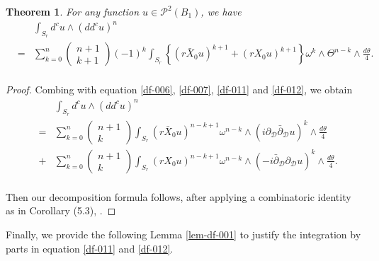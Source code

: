 \documentclass[a4paper,11pt]{amsart}
\numberwithin{equation}{section}
\newtheorem{theorem}{Theorem}[section]
\def\dbar{\bar\partial}
\def\d{\partial}
\def\cP{{\mathcal P}}
\def\cD{{\mathcal D}}
\def\cP{{\mathcal P}}
\begin{document}
\begin{theorem}
\label{thm-df-001}
For any function $u\in \cP^{2}(B_1)$, we have 
\begin{eqnarray}
\label{df-013}
&& \int_{S_r} d^cu \wedge (dd^c u)^n 
 \nonumber\\
 &=& \sum_{k=0}^{n}  \left( \begin{array}{c} n+1 \\ k+1 \end{array} \right) (-1)^k 
 \int_{S_r} \left\{   (r \bar X_0 u)^{k+1} + (r X_0 u)^{k+1} \right\} \omega^k \wedge \Theta^{n-k}\wedge \frac{d\theta}{4}. 
 \nonumber\\
\end{eqnarray}
\end{theorem}
\begin{proof}
Combing with equation \eqref{df-006}, \eqref{df-007}, \eqref{df-011} and \eqref{df-012},
we obtain
\begin{eqnarray}
\label{df-014}
&& \int_{S_r} d^cu \wedge (dd^c u)^n 
 \nonumber\\
 &=& \sum_{k=0}^{n}  \left( \begin{array}{c} n+1 \\ k \end{array} \right)
 \int_{S_r}  (r \bar X_0 u)^{n-k+1} \omega^{n-k} \wedge (i \d_{\cD}\dbar_{\cD} u)^k \wedge \frac{d\theta}{4}
 \nonumber\\
 &+& \sum_{k=0}^{n}  \left( \begin{array}{c} n+1 \\ k \end{array} \right)
 \int_{S_r}  (r X_0 u)^{n-k+1} \omega^{n-k} \wedge (- i \dbar_{\cD} \d_{\cD} u)^k \wedge \frac{d\theta}{4}. 
 \nonumber\\
\end{eqnarray}

Then our decomposition formula follows, 
after applying a combinatoric identity as in Corollary (5.3), \cite{HLX}. 


\end{proof}

Finally, we provide the following Lemma \ref{lem-df-001} to justify the 
integration by parts in equation \eqref{df-011} and \eqref{df-012}.  
\end{document}
